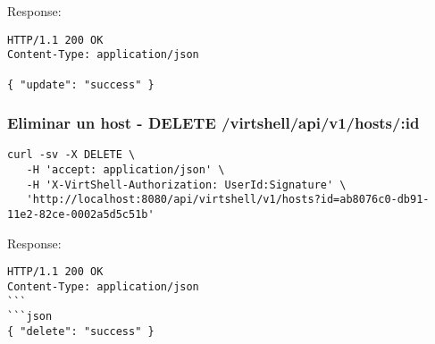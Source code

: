 Response:

\begin{lstlisting}[style=json]
HTTP/1.1 200 OK
Content-Type: application/json

{ "update": "success" }
\end{lstlisting}

\subsubsection{Eliminar un host - DELETE /virtshell/api/v1/hosts/:id}

\begin{lstlisting}[style=json]
curl -sv -X DELETE \
   -H 'accept: application/json' \
   -H 'X-VirtShell-Authorization: UserId:Signature' \
   'http://localhost:8080/api/virtshell/v1/hosts?id=ab8076c0-db91-11e2-82ce-0002a5d5c51b'
\end{lstlisting}

Response:

\begin{lstlisting}[style=json]
HTTP/1.1 200 OK
Content-Type: application/json
```
```json
{ "delete": "success" }
\end{lstlisting}